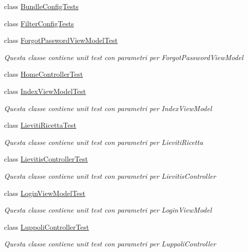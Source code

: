 \begin{DoxyCompactItemize}
class \mbox{\hyperlink{class_brew_day2_1_1_tests_1_1_bundle_config_tests}{Bundle\+Config\+Tests}}
\item 
class \mbox{\hyperlink{class_brew_day2_1_1_tests_1_1_filter_config_tests}{Filter\+Config\+Tests}}
\item 
class \mbox{\hyperlink{class_brew_day2_1_1_tests_1_1_forgot_password_view_model_test}{Forgot\+Password\+View\+Model\+Test}}
\begin{DoxyCompactList}\small\item\em Questa classe contiene unit test con parametri per Forgot\+Password\+View\+Model\end{DoxyCompactList}\item 
class \mbox{\hyperlink{class_brew_day2_1_1_tests_1_1_home_controller_test}{Home\+Controller\+Test}}
\item 
class \mbox{\hyperlink{class_brew_day2_1_1_tests_1_1_index_view_model_test}{Index\+View\+Model\+Test}}
\begin{DoxyCompactList}\small\item\em Questa classe contiene unit test con parametri per Index\+View\+Model\end{DoxyCompactList}\item 
class \mbox{\hyperlink{class_brew_day2_1_1_tests_1_1_lieviti_ricetta_test}{Lieviti\+Ricetta\+Test}}
\begin{DoxyCompactList}\small\item\em Questa classe contiene unit test con parametri per Lieviti\+Ricetta\end{DoxyCompactList}\item 
class \mbox{\hyperlink{class_brew_day2_1_1_tests_1_1_lievitis_controller_test}{Lievitis\+Controller\+Test}}
\begin{DoxyCompactList}\small\item\em Questa classe contiene unit test con parametri per Lievitis\+Controller\end{DoxyCompactList}\item 
class \mbox{\hyperlink{class_brew_day2_1_1_tests_1_1_login_view_model_test}{Login\+View\+Model\+Test}}
\begin{DoxyCompactList}\small\item\em Questa classe contiene unit test con parametri per Login\+View\+Model\end{DoxyCompactList}\item 
class \mbox{\hyperlink{class_brew_day2_1_1_tests_1_1_luppoli_controller_test}{Luppoli\+Controller\+Test}}
\begin{DoxyCompactList}\small\item\em Questa classe contiene unit test con parametri per Luppoli\+Controller\end{DoxyCompactList}\item 

\end{DoxyCompactItemize}
